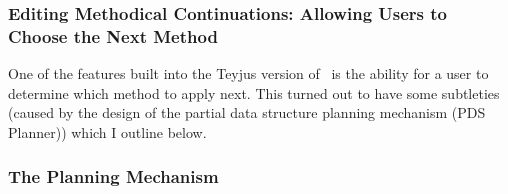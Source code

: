 \subsubsection{Editing Methodical
Continuations:  Allowing Users to
Choose the Next Method}
\label{editing}
One of the features built into the Teyjus version of \lclam\ is the
ability for a user to determine which method to apply next.  This
turned out to have some subtleties (caused by the design of the
partial data structure planning mechanism (PDS Planner)) which I outline below.

\subsubsection{The Planning Mechanism}

